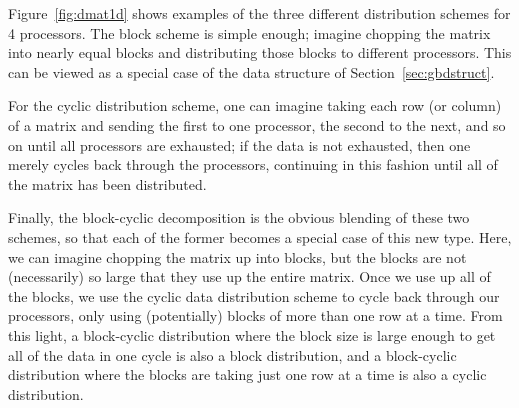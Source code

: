 Figure~\ref{fig:dmat1d} shows examples of the three different distribution schemes for 4 processors.  The block scheme is simple enough; imagine chopping the matrix into nearly equal blocks and distributing those blocks to different processors.  This can be viewed as a special case of the  data structure of Section~\ref{sec:gbdstruct}.  

For the cyclic distribution scheme, one can imagine taking each row (or column) of a matrix and sending the first to one processor, the second to the next, and so on until all processors are exhausted; if the data is not exhausted, then one merely cycles back through the processors, continuing in this fashion until all of the matrix has been distributed.

Finally, the block-cyclic decomposition is the obvious blending of these two schemes, so that each of the former becomes a special case of this new type.  Here, we can imagine chopping the matrix up into blocks, but the blocks are not (necessarily) so large that they use up the entire matrix.  Once we use up all of the blocks, we use the cyclic data distribution scheme to cycle back through our processors, only using (potentially) blocks of more than one row at a time.  From this light, a block-cyclic distribution where the block size is large enough to get all of the data in one cycle is also a block distribution, and a block-cyclic distribution where the blocks are taking just one row at a time is also a cyclic distribution.

